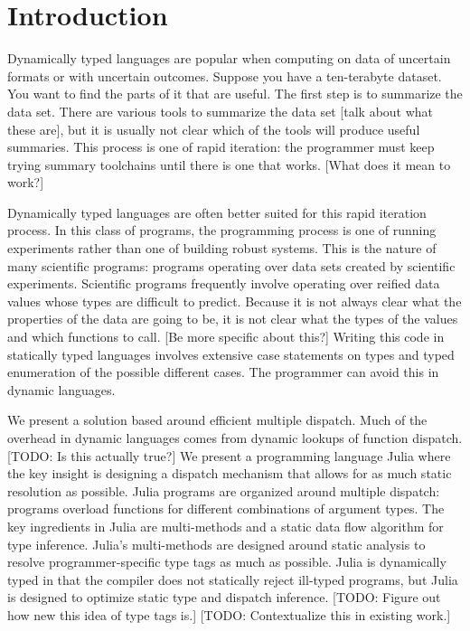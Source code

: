 \section{Introduction}

Dynamically typed languages are popular when computing on data of uncertain formats or with uncertain outcomes. Suppose you have a ten-terabyte dataset. You want to find the parts of it that are useful. The first step is to summarize the data set. There are various tools to summarize the data set [talk about what these are], but it is usually not clear which of the tools will produce useful summaries. This process is one of rapid iteration: the programmer must keep trying summary toolchains until there is one that works. [What does it mean to work?]

Dynamically typed languages are often better suited for this rapid iteration process. In this class of programs, the programming process is one of running experiments rather than one of building robust systems. This is the nature of many scientific programs: programs operating over data sets created by scientific experiments. Scientific programs frequently involve operating over reified data values whose types are difficult to predict. Because it is not always clear what the properties of the data are going to be, it is not clear what the types of the values and which functions to call. [Be more specific about this?] Writing this code in statically typed languages involves extensive case statements on types and typed enumeration of the possible different cases. The programmer can avoid this in dynamic languages.

We present a solution based around efficient multiple dispatch. Much of the overhead in dynamic languages comes from dynamic lookups of function dispatch. [TODO: Is this actually true?] We present a programming language Julia where the key insight is designing a dispatch mechanism that allows for as much static resolution as possible. Julia programs are organized around multiple dispatch: programs overload functions for different combinations of argument types. The key ingredients in Julia are multi-methods and a static data flow algorithm for type inference. Julia’s multi-methods are designed around static analysis to resolve programmer-specific type tags as much as possible. Julia is dynamically typed in that the compiler does not statically reject ill-typed programs, but Julia is designed to optimize static type and dispatch inference.
 [TODO: Figure out how new this idea of type tags is.] [TODO: Contextualize this in existing work.]

